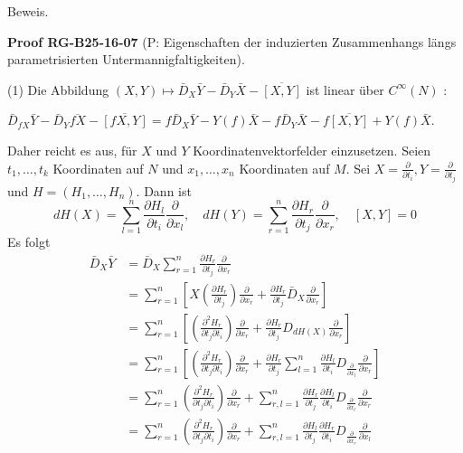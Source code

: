 \documentclass[10pt, letterpaper]{article}
\newcommand{\CustomHeading}[3]{%
  \par\medskip\noindent%
  \textbf{#1 #2} \textnormal{(#3)}.\enskip%
}
\newenvironment{PROOF}[2]{\begin{unitbox}\CustomHeading{Proof}{#1}{#2}}{\end{unitbox}}
\begin{document}
Beweis. 

\begin{PROOF}{RG-B25-16-07}{P: Eigenschaften der induzierten Zusammenhangs längs parametrisierten Untermannigfaltigkeiten}
(1) Die Abbildung $(X, Y) \mapsto \bar{D}_{X} \bar{Y}-\bar{D}_{Y} \bar{X}-\overline{[X, Y]}$ ist linear über $C^{\infty}(N)$ :

$\bar{D}_{f X} \bar{Y}-\bar{D}_{Y} \overline{f X}-\overline{[f X, Y]}=f \bar{D}_{X} \bar{Y}-Y(f) \bar{X}-f \bar{D}_{Y} \bar{X}-f \overline{[X, Y]}+Y(f) \bar{X}$.

Daher reicht es aus, für $X$ und $Y$ Koordinatenvektorfelder einzusetzen. Seien $t_{1}, \ldots, t_{k}$ Koordinaten auf $N$ und $x_{1}, \ldots, x_{n}$ Koordinaten auf $M$. Sei $X=\frac{\partial}{\partial t_{i}}, Y=\frac{\partial}{\partial t_{j}}$ und $H=\left(H_{1}, \ldots, H_{n}\right)$. Dann ist
$$
d H(X)=\sum_{l=1}^{n} \frac{\partial H_{l}}{\partial t_{i}} \frac{\partial}{\partial x_{l}}, \quad d H(Y)=\sum_{r=1}^{n} \frac{\partial H_{r}}{\partial t_{j}} \frac{\partial}{\partial x_{r}}, \quad[X, Y]=0
$$
Es folgt
$$
\begin{aligned}
\bar{D}_{X} \bar{Y} & =\bar{D}_{X} \sum_{r=1}^{n} \frac{\partial H_{r}}{\partial t_{j}} \frac{\partial}{\partial x_{r}} \\
& =\sum_{r=1}^{n}\left[X\left(\frac{\partial H_{r}}{\partial t_{j}}\right) \frac{\partial}{\partial x_{r}}+\frac{\partial H_{r}}{\partial t_{j}} \bar{D}_{X} \frac{\partial}{\partial x_{r}}\right] \\
& =\sum_{r=1}^{n}\left[\left(\frac{\partial^{2} H_{r}}{\partial t_{j} \partial t_{i}}\right) \frac{\partial}{\partial x_{r}}+\frac{\partial H_{r}}{\partial t_{j}} D_{d H(X)} \frac{\partial}{\partial x_{r}}\right] \\
& =\sum_{r=1}^{n}\left[\left(\frac{\partial^{2} H_{r}}{\partial t_{j} \partial t_{i}}\right) \frac{\partial}{\partial x_{r}}+\frac{\partial H_{r}}{\partial t_{j}} \sum_{l=1}^{n} \frac{\partial H_{l}}{\partial t_{i}} D_{\frac{\partial}{\partial x_{l}}} \frac{\partial}{\partial x_{r}}\right] \\
& =\sum_{r=1}^{n}\left(\frac{\partial^{2} H_{r}}{\partial t_{j} \partial t_{i}}\right) \frac{\partial}{\partial x_{r}}+\sum_{r, l=1}^{n} \frac{\partial H_{r}}{\partial t_{j}} \frac{\partial H_{l}}{\partial t_{i}} D_{\frac{\partial}{\partial x_{l}}} \frac{\partial}{\partial x_{r}} \\
& =\sum_{r=1}^{n}\left(\frac{\partial^{2} H_{r}}{\partial t_{j} \partial t_{i}}\right) \frac{\partial}{\partial x_{r}}+\sum_{r, l=1}^{n} \frac{\partial H_{l}}{\partial t_{j}} \frac{\partial H_{r}}{\partial t_{i}} D_{\frac{\partial}{\partial x_{r}}} \frac{\partial}{\partial x_{l}}

\end{aligned}$$
\end{PROOF}
\end{document}
